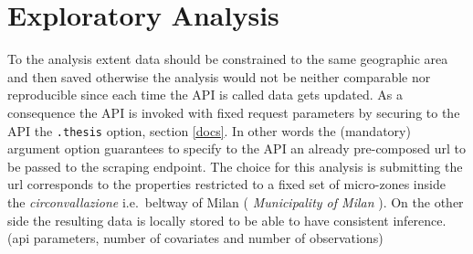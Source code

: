 \documentclass[
  12pt,
  a4paper,
  oneside]{book}
\newcommand{\passthrough}[1]{#1}
\theoremstyle{definition}
\theoremstyle{definition}
\theoremstyle{definition}
\theoremstyle{remark}
\begin{document}
\hypertarget{exploratory}{%
\chapter{Exploratory Analysis}\label{exploratory}}

To the analysis extent data should be constrained to the same geographic area and then saved otherwise the analysis would not be neither comparable nor reproducible since each time the API is called data gets updated. As a consequence the API is invoked with fixed request parameters by securing to the API the \passthrough{\lstinline!.thesis!} option, section \ref{docs}. In other words the (mandatory) argument option guarantees to specify to the API an already pre-composed url to be passed to the scraping endpoint. The choice for this analysis is submitting the url corresponds to the properties restricted to a fixed set of micro-zones inside the \emph{circonvallazione} i.e.~beltway of Milan ( \emph{Municipality of Milan} ). On the other side the resulting data is locally stored to be able to have consistent inference. (api parameters, number of covariates and number of observations)
\end{document}
